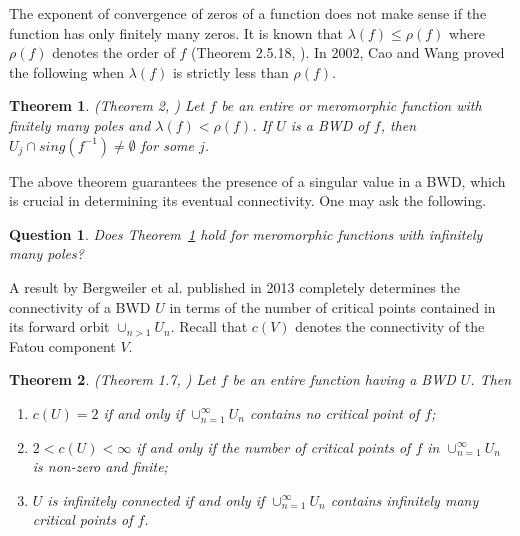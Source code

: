 \documentclass[11pt,a4paper]{article}
\newtheorem{theorem}{Theorem}[section]
\newtheorem{Question}{Question}
\begin{document}
	The exponent of convergence of zeros of a function does not make sense if the function has only finitely many zeros. It is known that  $\lambda(f) \leq \rho(f)$ where $\rho(f)$ denotes the order of $f$ (Theorem 2.5.18, \cite{Boas-1954}).  In 2002, Cao and Wang proved the following when  $\lambda(f) $ is strictly less than  $ \rho(f)$.
	\begin{theorem}(Theorem 2, \cite{CaoWang 2002})
		Let $f$ be an entire or meromorphic function with finitely many poles and $\lambda(f)<\rho(f)$. If $U$ is a BWD of $f$, then $U_j\cap sing(f^{-1})\neq\emptyset$ for some $j$.
	\label{sing-BWD}\end{theorem}
	The above theorem guarantees the presence of a singular value  in a BWD, which is crucial in determining its eventual connectivity. One may ask the following.
	\begin{Question}
Does Theorem~\ref{sing-BWD} hold for meromorphic functions with infinitely many poles?
	\end{Question}
A  result by Bergweiler et al. published in 2013 completely determines the connectivity of a BWD $U$ in terms of the number of critical points contained in its forward orbit $\cup_{n>1} U_n$. Recall that $c(V)$ denotes the connectivity of the Fatou component $V$. 
	\begin{theorem}(Theorem 1.7, \cite{BergRippStall 2013})
		Let $f$ be an entire function having a BWD $U$. Then 
		\begin{enumerate}
			\item $c(U)=2$ if and only if $\cup_{n=1}^{\infty}U_n$ contains no critical point of $f$;
			\item $2<c(U)<\infty$ if and only if the number of critical points of $f$ in $\cup_{n=1}^{\infty}U_n$ is non-zero and finite;
			\item $U$ is infinitely connected if and only if $\cup_{n=1}^{\infty}U_n$ contains infinitely many critical points of $f$.
		\end{enumerate}
		\label{connectivity-criticalpoints}
	\end{theorem}
\end{document}
